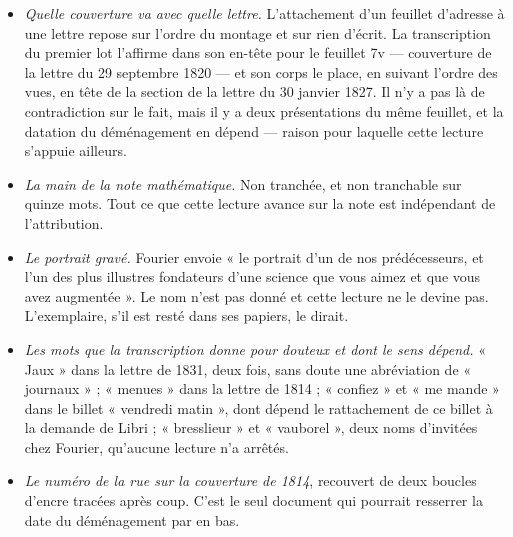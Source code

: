 \documentclass[11pt,a4paper]{article}
\begin{document}
\begin{itemize}
  \item \emph{Quelle couverture va avec quelle lettre.} L'attachement d'un
    feuillet d'adresse à une lettre repose sur l'ordre du montage et sur rien
    d'écrit. La transcription du premier lot l'affirme dans son en-tête pour le
    feuillet 7v --- couverture de la lettre du 29 septembre 1820 --- et son
    corps le place, en suivant l'ordre des vues, en tête de la section de la
    lettre du 30 janvier 1827. Il n'y a pas là de contradiction sur le fait,
    mais il y a deux présentations du même feuillet, et la datation du
    déménagement en dépend --- raison pour laquelle cette lecture s'appuie
    ailleurs.
  \item \emph{La main de la note mathématique.} Non tranchée, et non
    tranchable sur quinze mots. Tout ce que cette lecture avance sur la note
    est indépendant de l'attribution.
  \item \emph{Le portrait gravé.} Fourier envoie « le portrait d'un de nos
    prédécesseurs, et l'un des plus illustres fondateurs d'une science que vous
    aimez et que vous avez augmentée ». Le nom n'est pas donné et cette lecture
    ne le devine pas. L'exemplaire, s'il est resté dans ses papiers, le dirait.
  \item \emph{Les mots que la transcription donne pour douteux et dont le sens
    dépend.} « Jaux » dans la lettre de 1831, deux fois, sans doute
    une abréviation de « journaux » ; « menues » dans la lettre de
    1814 ; « confiez » et « me mande » dans le billet
    « vendredi matin », dont dépend le rattachement de ce billet à la demande
    de Libri ; « bresslieur » et « vauborel », deux noms
    d'invitées chez Fourier, qu'aucune lecture n'a arrêtés.
  \item \emph{Le numéro de la rue sur la couverture de 1814}, recouvert de deux
    boucles d'encre tracées après coup. C'est le seul document qui pourrait
    resserrer la date du déménagement par en bas.
\end{itemize}
\end{document}
